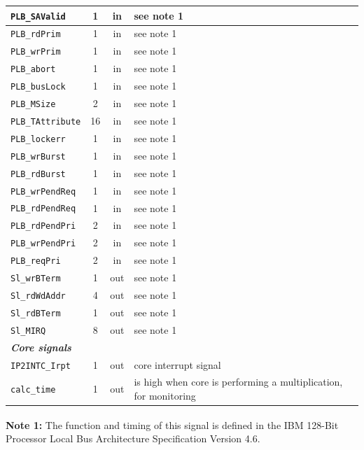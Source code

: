 \begin{tabular}{|l|c|c|l|}
	\hline
	\verb|PLB_SAValid| & 1     & in & see note 1 \\
	\hline
	\verb|PLB_rdPrim| & 1     & in & see note 1 \\
	\hline
	\verb|PLB_wrPrim| & 1     & in & see note 1 \\
	\hline
	\verb|PLB_abort| & 1     & in & see note 1 \\
	\hline
	\verb|PLB_busLock| & 1     & in & see note 1 \\
	\hline
	\verb|PLB_MSize| & 2     & in & see note 1 \\
	\hline
	\verb|PLB_TAttribute| & 16    & in & see note 1 \\
	\hline
	\verb|PLB_lockerr| & 1     & in & see note 1 \\
	\hline
	\verb|PLB_wrBurst| & 1     & in & see note 1 \\
	\hline
	\verb|PLB_rdBurst| & 1     & in & see note 1 \\
	\hline
	\verb|PLB_wrPendReq| & 1     & in & see note 1 \\
	\hline
	\verb|PLB_rdPendReq| & 1     & in & see note 1 \\
	\hline
	\verb|PLB_rdPendPri| & 2     & in & see note 1 \\
	\hline
	\verb|PLB_wrPendPri| & 2     & in & see note 1 \\
	\hline
	\verb|PLB_reqPri| & 2     & in & see note 1 \\
	\hline
	\verb|Sl_wrBTerm| & 1     & out & see note 1 \\
	\hline
	\verb|Sl_rdWdAddr| & 4     & out & see note 1 \\
	\hline
	\verb|Sl_rdBTerm| & 1     & out & see note 1 \\
	\hline
	\verb|Sl_MIRQ| & 8     & out & see note 1 \\
	\hline
	\multicolumn{4}{|l|}{\textit{\textbf{Core signals}}} \\
	\hline
	\verb|IP2INTC_Irpt| & 1     & out   & core interrupt signal \\
	\hline
	\verb|calc_time| & 1     & out   & is high when core is performing a multiplication, for monitoring \\
	\hline
\end{tabular}%
\newline \newline
\textbf{Note 1:} The function and timing of this signal is defined in the IBM\textsuperscript{\textregistered} 128-Bit Processor Local Bus Architecture Specification
Version 4.6.

